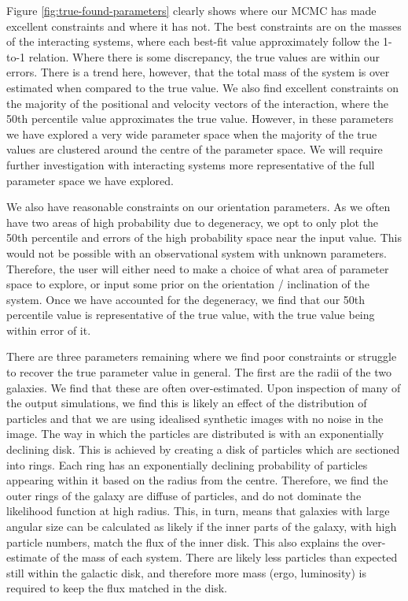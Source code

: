 Figure \ref{fig:true-found-parameters} clearly shows where our MCMC has made excellent constraints and where it has not. The best constraints are on the masses of the interacting systems, where each best-fit value approximately follow the 1-to-1 relation. Where there is some discrepancy, the true values are within our errors. There is a trend here, however, that the total mass of the system is over estimated when compared to the true value. We also find excellent constraints on the majority of the positional and velocity vectors of the interaction, where the 50th percentile value approximates the true value. However, in these parameters we have explored a very wide parameter space when the majority of the true values are clustered around the centre of the parameter space. We will require further investigation with interacting systems more representative of the full parameter space we have explored. 

We also have reasonable constraints on our orientation parameters. As we often have two areas of high probability due to degeneracy, we opt to only plot the 50th percentile and errors of the high probability space near the input value. This would not be possible with an observational system with unknown parameters. Therefore, the user will either need to make a choice of what area of parameter space to explore, or input some prior on the orientation / inclination of the system. Once we have accounted for the degeneracy, we find that our 50th percentile value is representative of the true value, with the true value being within error of it. 

There are three parameters remaining where we find poor constraints or struggle to recover the true parameter value in general. The first are the radii of the two galaxies. We find that these are often over-estimated. Upon inspection of many of the output simulations, we find this is likely an effect of the distribution of particles and that we are using idealised synthetic images with no noise in the image. The way in which the particles are distributed is with an exponentially declining disk. This is achieved by creating a disk of particles which are sectioned into rings. Each ring has an exponentially declining probability of particles appearing within it based on the radius from the centre. Therefore, we find the outer rings of the galaxy are diffuse of particles, and do not dominate the likelihood function at high radius. This, in turn, means that galaxies with large angular size can be calculated as likely if the inner parts of the galaxy, with high particle numbers, match the flux of the inner disk. This also explains the over-estimate of the mass of each system. There are likely less particles than expected still within the galactic disk, and therefore more mass (ergo, luminosity) is required to keep the flux matched in the disk.

